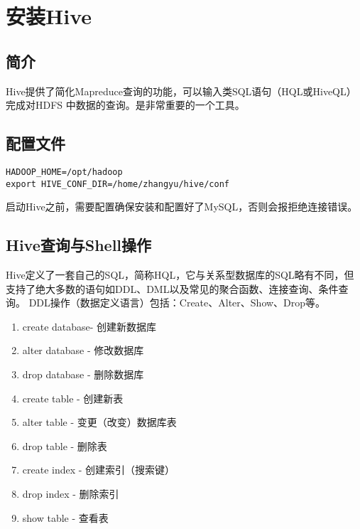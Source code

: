 \section{安装Hive}
\subsection{简介}
Hive提供了简化Mapreduce查询的功能，可以输入类SQL语句（HQL或HiveQL）完成对HDFS
中数据的查询。是非常重要的一个工具。

\subsection{配置文件}

\begin{lstlisting}[style=mysh, title=hive-env.sh]
HADOOP_HOME=/opt/hadoop
export HIVE_CONF_DIR=/home/zhangyu/hive/conf	
\end{lstlisting}


启动Hive之前，需要配置确保安装和配置好了MySQL，否则会报拒绝连接错误。


\subsection{Hive查询与Shell操作}
Hive定义了一套自己的SQL，简称HQL，它与关系型数据库的SQL略有不同，但支持了绝大多数的语句如DDL、DML以及常见的聚合函数、连接查询、条件查询。
DDL操作（数据定义语言）包括：Create、Alter、Show、Drop等。
\begin{enumerate}
\item create database- 创建新数据库
\item alter database - 修改数据库
\item drop database - 删除数据库
\item create table - 创建新表
\item alter table - 变更（改变）数据库表
\item drop table - 删除表
\item create index - 创建索引（搜索键）
\item drop index - 删除索引
\item show table - 查看表
\end{enumerate}

